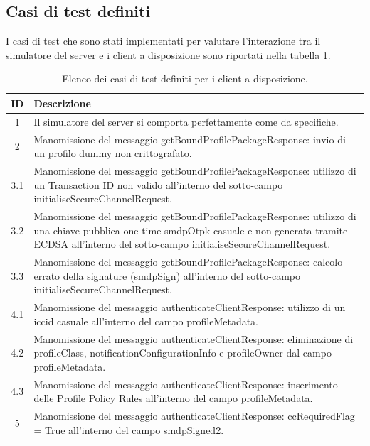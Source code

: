 \documentclass[10pt, oneside]{book}
\begin{document}
\subsection{Casi di test definiti}
I casi di test che sono stati implementati per valutare l'interazione tra il simulatore del server e i client a disposizione sono riportati nella tabella \ref{tab:clients-test-cases}.\\
\begin{table}[h!]
\begin{center}
\captionsetup{skip=4pt}
\caption{Elenco dei casi di test definiti per i client a disposizione.}
\label{tab:clients-test-cases}
\begin{tabularx}{\textwidth}{|c|X|} %
\hline
\textbf{ID} & \textbf{Descrizione}\\
\hline
1 & Il simulatore del server si comporta perfettamente come da specifiche.\\
\hline
2 & Manomissione del messaggio getBoundProfilePackageResponse: invio di un profilo dummy non crittografato.\\
\hline
3.1 & Manomissione del messaggio getBoundProfilePackageResponse: utilizzo di un Transaction ID non valido all'interno del sotto-campo initialiseSecureChannelRequest.\\
\hline
3.2 & Manomissione del messaggio getBoundProfilePackageResponse: utilizzo di una chiave pubblica one-time smdpOtpk casuale e non generata tramite ECDSA all'interno del sotto-campo initialiseSecureChannelRequest.\\
\hline
3.3 & Manomissione del messaggio getBoundProfilePackageResponse: calcolo errato della signature (smdpSign) all'interno del sotto-campo initialiseSecureChannelRequest.\\
\hline
4.1 & Manomissione del messaggio authenticateClientResponse: utilizzo di un iccid casuale all'interno del campo profileMetadata.\\
\hline
4.2 & Manomissione del messaggio authenticateClientResponse: eliminazione di profileClass, notificationConfigurationInfo e profileOwner dal campo profileMetadata.\\
\hline
4.3 & Manomissione del messaggio authenticateClientResponse: inserimento delle Profile Policy Rules all'interno del campo profileMetadata.\\
\hline
5 & Manomissione del messaggio authenticateClientResponse: ccRequiredFlag = True all'interno del campo smdpSigned2.\\

\end{tabularx}
\end{center}
\end{table}
\end{document}
